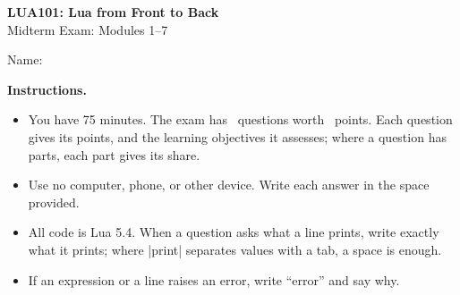 \documentclass[11pt,addpoints]{exam}
\begin{document}
\begin{center}
  {\Large\bfseries LUA101: Lua from Front to Back}\\[0.5ex]
  {\large Midterm Exam: Modules 1--7}
\end{center}

\vspace{1em}
\noindent Name: \makebox[0.6\textwidth]{\hrulefill}

\vspace{1em}
\noindent\textbf{Instructions.}
\begin{itemize}
  \item You have 75 minutes. The exam has \numquestions\ questions worth \numpoints\ points. Each
    question gives its points, and the learning objectives it assesses; where a question has
    parts, each part gives its share.
  \item Use no computer, phone, or other device. Write each answer in the space provided.
  \item All code is Lua 5.4. When a question asks what a line prints, write exactly what it
    prints; where \code|print| separates values with a tab, a space is enough.
  \item If an expression or a line raises an error, write ``error'' and say why.
\end{itemize}

\begin{center}
  \gradetable[h][pages]
\end{center}
\end{document}
